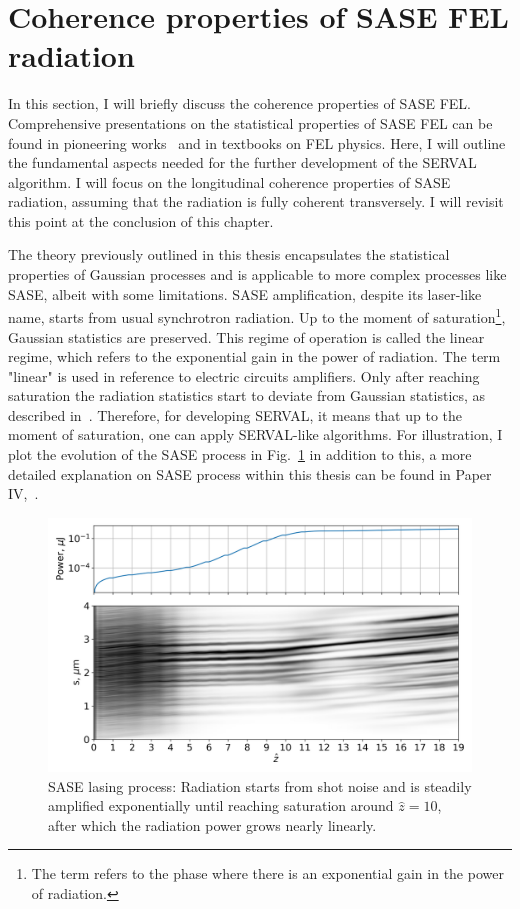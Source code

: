 
\section{Coherence properties of SASE FEL radiation}
    In this section, I will briefly discuss the coherence properties of SASE FEL. Comprehensive presentations on the statistical properties of SASE FEL can be found in pioneering works~\cite{saldin_statistical_1998} and in textbooks on FEL physics. Here, I will outline the fundamental aspects needed for the further development of the SERVAL algorithm. I will focus on the longitudinal coherence properties of SASE radiation, assuming that the radiation is fully coherent transversely. I will revisit this point at the conclusion of this chapter.

    
    The theory previously outlined in this thesis encapsulates the statistical properties of Gaussian processes and is applicable to more complex processes like SASE, albeit with some limitations. SASE amplification, despite its laser-like name, starts from usual synchrotron radiation. Up to the moment of saturation\footnote{The term refers to the phase where there is an exponential gain in the power of radiation.}, Gaussian statistics are preserved. This regime of operation is called the linear regime, which refers to the exponential gain in the power of radiation. The term "linear" is used in reference to electric circuits amplifiers. Only after reaching saturation the radiation statistics start to deviate from Gaussian statistics, as described in~\cite{saldin_statistical_1998}. Therefore, for developing SERVAL, it means that up to the moment of saturation, one can apply SERVAL-like algorithms. For illustration, I plot the evolution of the SASE process in Fig.~\ref{Fig:evo_spikes} in addition to this, a more detailed explanation on SASE process within this thesis can be found in Paper IV,~\cite{trebushinin_experimental_2023}.
    \begin{figure}[h!]
    	\centering
        \includegraphics[width=0.95\linewidth]{content/images/4_FEL_Theory/evo_spikes.png}
    \captionsetup{justification=centering}
        \caption{SASE lasing process: Radiation starts from shot noise and is steadily amplified exponentially until reaching saturation around $\hat{z} = 10$, after which the radiation power grows nearly linearly.}
        \label{Fig:evo_spikes}
    \end{figure}
    
